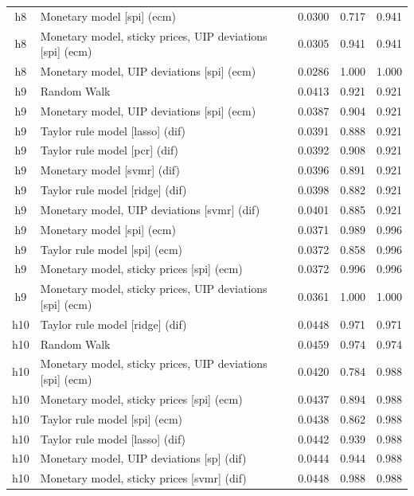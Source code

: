 \begin{ThreePartTable}
\begin{longtable}[t]{cp{5.5cm}ccc}
h8 & \raggedright Monetary model [spi] (ecm) & 0.0300 & 0.717 & 0.941\\
h8 & \raggedright Monetary model, sticky prices, UIP deviations [spi] (ecm) & 0.0305 & 0.941 & 0.941\\
h8 & \raggedright Monetary model, UIP deviations [spi] (ecm) & 0.0286 & 1.000 & 1.000\\
\addlinespace
h9 & \raggedright Random Walk & 0.0413 & 0.921 & 0.921\\
h9 & \raggedright Monetary model, UIP deviations [spi] (ecm) & 0.0387 & 0.904 & 0.921\\
h9 & \raggedright Taylor rule model [lasso] (dif) & 0.0391 & 0.888 & 0.921\\
h9 & \raggedright Taylor rule model [pcr] (dif) & 0.0392 & 0.908 & 0.921\\
h9 & \raggedright Monetary model [svmr] (dif) & 0.0396 & 0.891 & 0.921\\
h9 & \raggedright Taylor rule model [ridge] (dif) & 0.0398 & 0.882 & 0.921\\
h9 & \raggedright Monetary model, UIP deviations [svmr] (dif) & 0.0401 & 0.885 & 0.921\\
h9 & \raggedright Monetary model [spi] (ecm) & 0.0371 & 0.989 & 0.996\\
h9 & \raggedright Taylor rule model [spi] (ecm) & 0.0372 & 0.858 & 0.996\\
h9 & \raggedright Monetary model, sticky prices [spi] (ecm) & 0.0372 & 0.996 & 0.996\\
h9 & \raggedright Monetary model, sticky prices, UIP deviations [spi] (ecm) & 0.0361 & 1.000 & 1.000\\
\addlinespace
h10 & \raggedright Taylor rule model [ridge] (dif) & 0.0448 & 0.971 & 0.971\\
h10 & \raggedright Random Walk & 0.0459 & 0.974 & 0.974\\
h10 & \raggedright Monetary model, sticky prices, UIP deviations [spi] (ecm) & 0.0420 & 0.784 & 0.988\\
h10 & \raggedright Monetary model, sticky prices [spi] (ecm) & 0.0437 & 0.894 & 0.988\\
h10 & \raggedright Taylor rule model [spi] (ecm) & 0.0438 & 0.862 & 0.988\\
h10 & \raggedright Taylor rule model [lasso] (dif) & 0.0442 & 0.939 & 0.988\\
h10 & \raggedright Monetary model, UIP deviations [sp] (dif) & 0.0444 & 0.944 & 0.988\\
h10 & \raggedright Monetary model, sticky prices [svmr] (dif) & 0.0448 & 0.988 & 0.988\\

\end{longtable}
\end{ThreePartTable}
